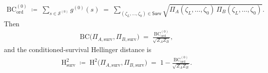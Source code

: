 \begin{theoremenv}
\begin{enumerate}
\begin{align}
            \mathrm{BC}_{\mathrm{ord}}^{(0)}
            \;\coloneqq\;
            \sum_{s \in \mathcal{S}^{(0)}} g^{(0)}(s)
            \;=\;
            \sum_{(\zeta_L,\ldots,\zeta_0) \in \mathsf{Surv}} \sqrt{\Pi_A(\zeta_L,\ldots,\zeta_0)\,
            \Pi_B(\zeta_L,\ldots,\zeta_0)}.
        \end{align}
        Then
        \begin{align}\label{ptnb:eq:conditioned-bc-posthoc}
            \mathrm{BC}\!\bigl(\Pi_{A,\mathrm{surv}}, \Pi_{B,\mathrm{surv}}\bigr)
            \;=\;
            \frac{\mathrm{BC}_{\mathrm{ord}}^{(0)}}{\sqrt{Z_A Z_B}},
        \end{align}
        and the conditioned-survival Hellinger distance is
        \begin{align}\label{ptnb:eq:conditioned-h2}
            \mathrm{H}_{\mathrm{surv}}^2
            \;\coloneqq\;
            \mathrm{H}^2\!\bigl(\Pi_{A,\mathrm{surv}}, \Pi_{B,\mathrm{surv}}\bigr)
            \;=\;
            1 - \frac{\mathrm{BC}_{\mathrm{ord}}^{(0)}}{\sqrt{Z_A Z_B}}.
        \end{align}
\end{enumerate}\end{theoremenv}

